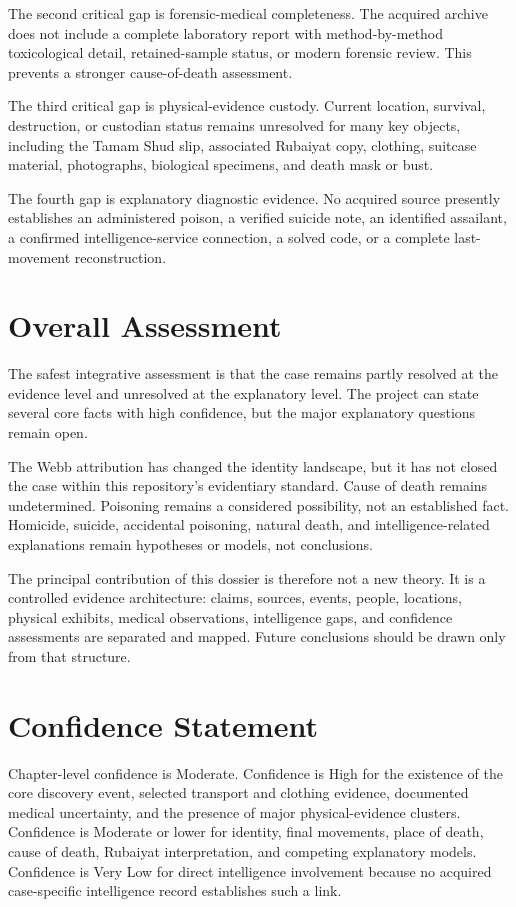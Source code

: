 The second critical gap is forensic-medical completeness. The acquired archive does not include a complete laboratory report with method-by-method toxicological detail, retained-sample status, or modern forensic review. This prevents a stronger cause-of-death assessment.

The third critical gap is physical-evidence custody. Current location, survival, destruction, or custodian status remains unresolved for many key objects, including the Tamam Shud slip, associated Rubaiyat copy, clothing, suitcase material, photographs, biological specimens, and death mask or bust.

The fourth gap is explanatory diagnostic evidence. No acquired source presently establishes an administered poison, a verified suicide note, an identified assailant, a confirmed intelligence-service connection, a solved code, or a complete last-movement reconstruction.

\section{Overall Assessment}

The safest integrative assessment is that the case remains partly resolved at the evidence level and unresolved at the explanatory level. The project can state several core facts with high confidence, but the major explanatory questions remain open.

The Webb attribution has changed the identity landscape, but it has not closed the case within this repository's evidentiary standard. Cause of death remains undetermined. Poisoning remains a considered possibility, not an established fact. Homicide, suicide, accidental poisoning, natural death, and intelligence-related explanations remain hypotheses or models, not conclusions.

The principal contribution of this dossier is therefore not a new theory. It is a controlled evidence architecture: claims, sources, events, people, locations, physical exhibits, medical observations, intelligence gaps, and confidence assessments are separated and mapped. Future conclusions should be drawn only from that structure.

\section{Confidence Statement}

Chapter-level confidence is Moderate. Confidence is High for the existence of the core discovery event, selected transport and clothing evidence, documented medical uncertainty, and the presence of major physical-evidence clusters. Confidence is Moderate or lower for identity, final movements, place of death, cause of death, Rubaiyat interpretation, and competing explanatory models. Confidence is Very Low for direct intelligence involvement because no acquired case-specific intelligence record establishes such a link.
